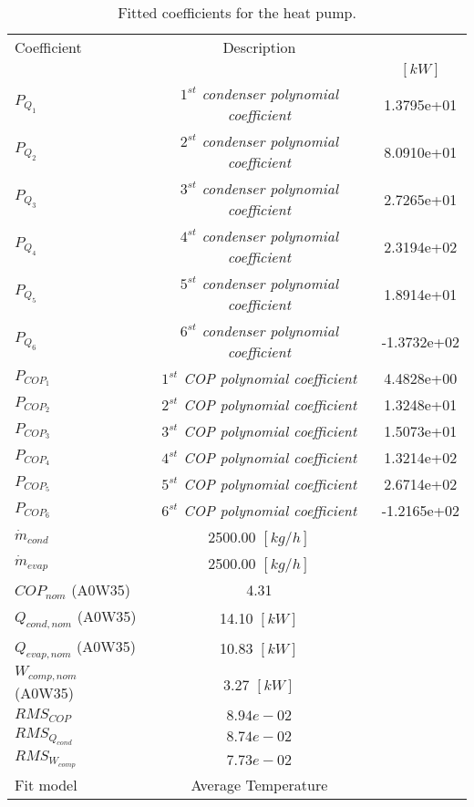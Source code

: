 \documentclass[english]{SPFShortReport}
\author{Dani Carbonell}
\begin{document}
\begin{table}[!ht]
\begin{small}
\caption{Fitted coefficients for the heat pump.}
\begin{center}
\resizebox{12cm}{!} 
{
\begin{tabular}{l | c c } 
\hline
\hline
Coefficient &Description & \\ 
 & &$[kW]$\\ 
\hline
$P_{Q_{1}}$ & \emph{$1^{st}$ condenser polynomial coefficient}  & 1.3795e+01    \\ 
$P_{Q_{2}}$ & \emph{$2^{st}$ condenser polynomial coefficient}  & 8.0910e+01    \\ 
$P_{Q_{3}}$ & \emph{$3^{st}$ condenser polynomial coefficient}  & 2.7265e+01    \\ 
$P_{Q_{4}}$ & \emph{$4^{st}$ condenser polynomial coefficient}  & 2.3194e+02    \\ 
$P_{Q_{5}}$ & \emph{$5^{st}$ condenser polynomial coefficient}  & 1.8914e+01    \\ 
$P_{Q_{6}}$ & \emph{$6^{st}$ condenser polynomial coefficient}  & -1.3732e+02    \\ 
\hline
$P_{COP_{1}}$ & \emph{$1^{st}$ COP polynomial coefficient}  & 4.4828e+00    \\ 
$P_{COP_{2}}$ & \emph{$2^{st}$ COP polynomial coefficient}  & 1.3248e+01    \\ 
$P_{COP_{3}}$ & \emph{$3^{st}$ COP polynomial coefficient}  & 1.5073e+01    \\ 
$P_{COP_{4}}$ & \emph{$4^{st}$ COP polynomial coefficient}  & 1.3214e+02    \\ 
$P_{COP_{5}}$ & \emph{$5^{st}$ COP polynomial coefficient}  & 2.6714e+02    \\ 
$P_{COP_{6}}$ & \emph{$6^{st}$ COP polynomial coefficient}  & -1.2165e+02    \\ 
\hline
$\dot m_{cond}$ & 2500.00 $[kg/h]$ \\ 
$\dot m_{evap}$ & 2500.00 $[kg/h]$ \\ 
\hline
$COP_{nom}$ (A0W35)& 4.31 \\ 
$Q_{cond,nom}$ (A0W35)& 14.10 $[kW]$\\ 
$Q_{evap,nom}$ (A0W35)& 10.83 $[kW]$\\ 
$W_{comp,nom}$ (A0W35)& 3.27 $[kW]$\\ 
\hline
 $RMS_{COP}$ & $8.94e-02$ \\ 
 $RMS_{Q_{cond}}$ & $8.74e-02$ \\ 
 $RMS_{W_{comp}}$ & $7.73e-02$ \\ 
\hline
Fit model & Average Temperature\\ 
\hline
\hline
\end{tabular}
}
\label{CoefTable}
\end{center}
\end{small}
\end{table}
\end{document}
